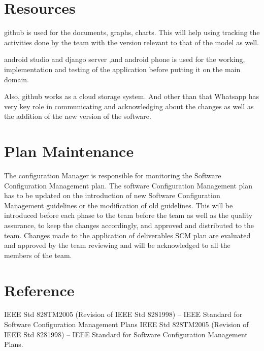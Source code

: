 \documentclass[]{article}
\begin{document}
\section{Resources}
github is used for the documents, graphs, charts. This will help using tracking the activities done by the team with the version relevant to that of the model as well.


android studio and django server ,and android phone is used for the working, implementation and testing of the application before putting it on the main domain.


Also, github works as a cloud storage system. And other than that Whatsapp has very key role in communicating and acknowledging about the changes as well as the addition of the new version of the software.

\section{Plan Maintenance}
The configuration Manager is responsible for monitoring the Software Configuration Management plan. The software Configuration Management plan has to be updated on the introduction of new Software Configuration Management guidelines or the modification of old guidelines. This will be introduced before each phase to the team before the team as well as the quality assurance, to keep the changes accordingly, and approved and distributed to the team. Changes made to the application of deliverables SCM plan are evaluated and approved by the team reviewing and will be acknowledged to all the members of the team.


\section{Reference}

IEEE Std 828TM­2005 (Revision of IEEE Std 828­1998) – IEEE Standard for Software Configuration Management Plans
IEEE Std 828TM­2005 (Revision of IEEE Std 828­1998) – IEEE Standard for Software Configuration Management Plans.
\end{document}
